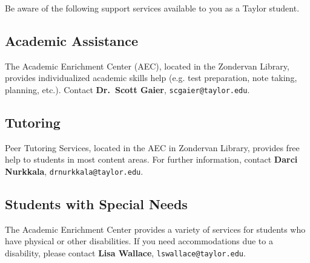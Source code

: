 Be aware of the following support services
available to you as a Taylor student.

\subsection{Academic Assistance}

The Academic Enrichment Center (AEC), located in the Zondervan Library,
provides individualized academic skills help
(e.g. test preparation, note taking, planning, etc.).
Contact \textbf{Dr.\ Scott Gaier}, \texttt{scgaier@taylor.edu}.
 
\subsection{Tutoring}

Peer Tutoring Services,
located in the AEC in Zondervan Library,
provides free help to students in most content areas.
For further information, contact
\textbf{Darci Nurkkala}, \texttt{drnurkkala@taylor.edu}.

\subsection{Students with Special Needs}

The Academic Enrichment Center provides a variety of services
for students who have physical or other disabilities.
If you need accommodations due to a disability, please contact
\textbf{Lisa Wallace}, \texttt{lswallace@taylor.edu}.

